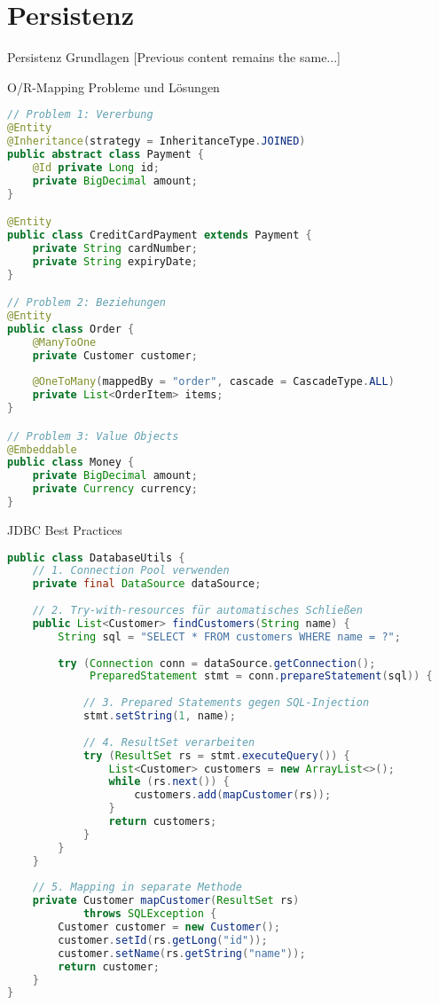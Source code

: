 \section{Persistenz}

\begin{concept}{Persistenz Grundlagen}
[Previous content remains the same...]
\end{concept}

\begin{example}{O/R-Mapping Probleme und Lösungen}
\begin{lstlisting}[language=Java]
// Problem 1: Vererbung
@Entity
@Inheritance(strategy = InheritanceType.JOINED)
public abstract class Payment {
    @Id private Long id;
    private BigDecimal amount;
}

@Entity
public class CreditCardPayment extends Payment {
    private String cardNumber;
    private String expiryDate;
}

// Problem 2: Beziehungen
@Entity
public class Order {
    @ManyToOne
    private Customer customer;
    
    @OneToMany(mappedBy = "order", cascade = CascadeType.ALL)
    private List<OrderItem> items;
}

// Problem 3: Value Objects
@Embeddable
public class Money {
    private BigDecimal amount;
    private Currency currency;
}
\end{lstlisting}
\end{example}

\begin{KR}{JDBC Best Practices}
\begin{lstlisting}[language=Java]
public class DatabaseUtils {
    // 1. Connection Pool verwenden
    private final DataSource dataSource;
    
    // 2. Try-with-resources für automatisches Schließen
    public List<Customer> findCustomers(String name) {
        String sql = "SELECT * FROM customers WHERE name = ?";
        
        try (Connection conn = dataSource.getConnection();
             PreparedStatement stmt = conn.prepareStatement(sql)) {
            
            // 3. Prepared Statements gegen SQL-Injection
            stmt.setString(1, name);
            
            // 4. ResultSet verarbeiten
            try (ResultSet rs = stmt.executeQuery()) {
                List<Customer> customers = new ArrayList<>();
                while (rs.next()) {
                    customers.add(mapCustomer(rs));
                }
                return customers;
            }
        }
    }
    
    // 5. Mapping in separate Methode
    private Customer mapCustomer(ResultSet rs) 
            throws SQLException {
        Customer customer = new Customer();
        customer.setId(rs.getLong("id"));
        customer.setName(rs.getString("name"));
        return customer;
    }
}
\end{lstlisting}
\end{KR}

